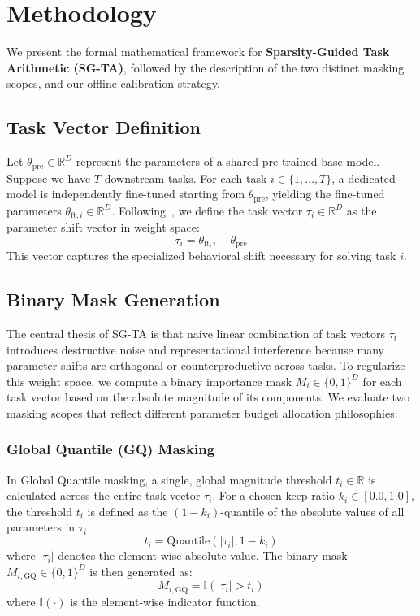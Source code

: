 \section{Methodology}
\label{sec:methodology}

We present the formal mathematical framework for \textbf{Sparsity-Guided Task Arithmetic (SG-TA)}, followed by the description of the two distinct masking scopes, and our offline calibration strategy.

\subsection{Task Vector Definition}
Let $\theta_{\text{pre}} \in \mathbb{R}^D$ represent the parameters of a shared pre-trained base model. Suppose we have $T$ downstream tasks. For each task $i \in \{1, \dots, T\}$, a dedicated model is independently fine-tuned starting from $\theta_{\text{pre}}$, yielding the fine-tuned parameters $\theta_{\text{ft}, i} \in \mathbb{R}^D$. Following~\cite{ilharco2022editing}, we define the task vector $\tau_i \in \mathbb{R}^D$ as the parameter shift vector in weight space:
\begin{equation}
\tau_i = \theta_{\text{ft}, i} - \theta_{\text{pre}}
\end{equation}
This vector captures the specialized behavioral shift necessary for solving task $i$.

\subsection{Binary Mask Generation}
The central thesis of SG-TA is that naive linear combination of task vectors $\tau_i$ introduces destructive noise and representational interference because many parameter shifts are orthogonal or counterproductive across tasks. To regularize this weight space, we compute a binary importance mask $M_i \in \{0, 1\}^D$ for each task vector based on the absolute magnitude of its components. We evaluate two masking scopes that reflect different parameter budget allocation philosophies:

\subsubsection{Global Quantile (GQ) Masking}
In Global Quantile masking, a single, global magnitude threshold $t_i \in \mathbb{R}$ is calculated across the entire task vector $\tau_i$. For a chosen keep-ratio $k_i \in [0.0, 1.0]$, the threshold $t_i$ is defined as the $(1 - k_i)$-quantile of the absolute values of all parameters in $\tau_i$:
\begin{equation}
t_i = \text{Quantile}(|\tau_i|, 1 - k_i)
\end{equation}
where $|\tau_i|$ denotes the element-wise absolute value. The binary mask $M_{i, \text{GQ}} \in \{0, 1\}^D$ is then generated as:
\begin{equation}
M_{i, \text{GQ}} = \mathbb{I}(|\tau_i| > t_i)
\end{equation}
where $\mathbb{I}(\cdot)$ is the element-wise indicator function. 

